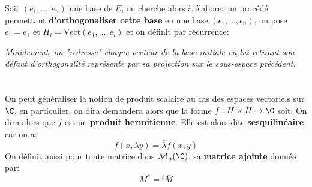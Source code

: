 \subsection*{}
Soit \((e_1, \ldots, e_n)\) une base de \(E\), on cherche alors à élaborer un procédé permettant \textbf{d'orthogonaliser cette base} en une base \((\epsilon_1, \ldots, \epsilon_n)\), on pose \(\epsilon_1 = e_1\) et \(H_i = \text{Vect}(e_1, \ldots, e_i)\) et on définit par récurrence:

\begin{center}
   \textit{Moralement, on "redresse" chaque vecteur de la base initiale en lui retirant son défaut d'orthogonalité représenté par sa projection sur le sous-espace précédent.}
\end{center}
\chapter*{}
On peut généraliser la notion de produit scalaire au cas des espaces vectoriels sur \(\C\), en particulier, on dira demandera alors que la forme \(f : H\times H \rightarrow \C\) soit:
On dira alors que \(f\) est un \textbf{produit hermitienne}. Elle est alors dite \textbf{sesquilinéaire} car on a:
\[
   f(x, \lambda y) = \overline{\lambda}f(x, y)
\]
On définit aussi pour toute matrice dans \(\mathcal{M}_n(\C)\), sa \textbf{matrice ajointe} donnée par:
\[
   M^* = {}^t\overline{M}
\]
